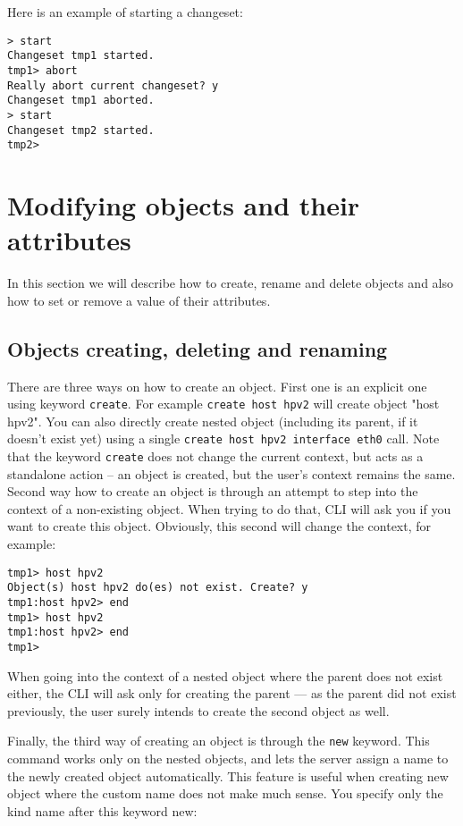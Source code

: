 \documentclass[deska]{subfiles}
\begin{document}
Here is an example of starting a changeset:
\begin{verbatim}
> start
Changeset tmp1 started.
tmp1> abort
Really abort current changeset? y
Changeset tmp1 aborted.
> start
Changeset tmp2 started.
tmp2>
\end{verbatim}

\section{Modifying objects and their attributes}

In this section we will describe how to create, rename and delete objects and also how to set or remove a value of their
attributes.

\subsection{Objects creating, deleting and renaming}

There are three ways on how to create an object. First one is an explicit one using keyword {\tt create}. For example {\tt create
host hpv2} will create object "host hpv2". You can also directly create nested object (including its parent, if it
doesn't exist yet) using a single {\tt create host hpv2 interface eth0} call. Note that the keyword {\tt create} does not change
the current context, but acts as a standalone action -- an object is created, but the user's context remains the same.
Second way how to create an object is through an attempt to step into the context of a non-existing object.
When trying to do that, CLI will ask you if you want to create this object. Obviously, this second will change the
context, for example:

\begin{verbatim}
tmp1> host hpv2
Object(s) host hpv2 do(es) not exist. Create? y
tmp1:host hpv2> end
tmp1> host hpv2
tmp1:host hpv2> end
tmp1>
\end{verbatim}

When going into the context of a nested object where the parent does not exist either, the CLI will ask only for creating the
parent --- as the parent did not exist previously, the user surely intends to create the second object as well.

Finally, the third way of creating an object is through the {\tt new} keyword. This command works only on the nested
objects, and lets the server assign a name to the newly created object automatically. This feature is useful when creating
new object where the custom name does not make much sense. You specify only the kind name after this keyword new:
\end{document}
